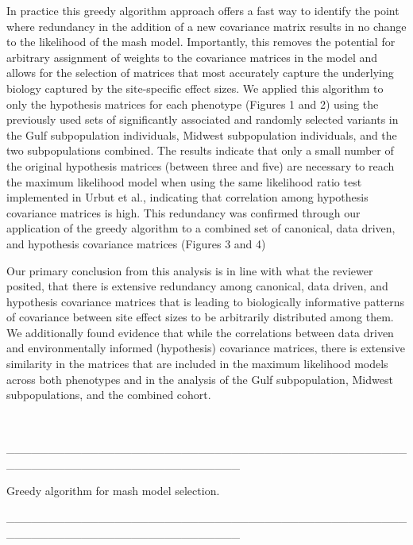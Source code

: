 \documentclass[
  letterpaper,
  DIV=11,
  numbers=noendperiod]{scrartcl}
\begin{document}
\hfill\break

In practice this greedy algorithm approach offers a fast way to identify
the point where redundancy in the addition of a new covariance matrix
results in no change to the likelihood of the mash model. Importantly,
this removes the potential for arbitrary assignment of weights to the
covariance matrices in the model and allows for the selection of
matrices that most accurately capture the underlying biology captured by
the site-specific effect sizes. We applied this algorithm to only the
hypothesis matrices for each phenotype (Figures 1 and 2) using the
previously used sets of significantly associated and randomly selected
variants in the Gulf subpopulation individuals, Midwest subpopulation
individuals, and the two subpopulations combined. The results indicate
that only a small number of the original hypothesis matrices (between
three and five) are necessary to reach the maximum likelihood model when
using the same likelihood ratio test implemented in Urbut et al.,
indicating that correlation among hypothesis covariance matrices is
high. This redundancy was confirmed through our application of the
greedy algorithm to a combined set of canonical, data driven, and
hypothesis covariance matrices (Figures 3 and 4)

Our primary conclusion from this analysis is in line with what the
reviewer posited, that there is extensive redundancy among canonical,
data driven, and hypothesis covariance matrices that is leading to
biologically informative patterns of covariance between site effect
sizes to be arbitrarily distributed among them. We additionally found
evidence that while the correlations between data driven and
environmentally informed (hypothesis) covariance matrices, there is
extensive similarity in the matrices that are included in the maximum
likelihood models across both phenotypes and in the analysis of the Gulf
subpopulation, Midwest subpopulations, and the combined cohort.

~

\_\_\_\_\_\_\_\_\_\_\_\_\_\_\_\_\_\_\_\_\_\_\_\_\_\_\_\_\_\_\_\_\_\_\_\_\_\_\_\_\_\_\_\_\_\_\_\_\_\_\_\_\_\_\_\_\_\_\_\_\_\_\_\_\_\_\_\_\_\_\_\_\_\_\_\_

Greedy algorithm for mash model selection.~

\_\_\_\_\_\_\_\_\_\_\_\_\_\_\_\_\_\_\_\_\_\_\_\_\_\_\_\_\_\_\_\_\_\_\_\_\_\_\_\_\_\_\_\_\_\_\_\_\_\_\_\_\_\_\_\_\_\_\_\_\_\_\_\_\_\_\_\_\_\_\_\_\_\_\_\_

\hfill\break
\end{document}
